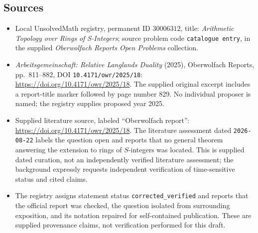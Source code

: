 \documentclass[11pt]{article}
\begin{document}
\subsection{Sources}
\begin{itemize}
\item Local UnsolvedMath registry, permanent ID \(30006312\), title: \emph{Arithmetic Topology over Rings of S-Integers}; source problem code \texttt{catalogue entry}, in the supplied \emph{Oberwolfach Reports Open Problems} collection.
\item \emph{Arbeitsgemeinschaft: Relative Langlands Duality} (2025), Oberwolfach Reports, pp.~811--882, DOI \texttt{10.4171/owr/2025/18}: \url{https://doi.org/10.4171/owr/2025/18}. The supplied original excerpt includes a report-title marker followed by page number 829. No individual proposer is named; the registry supplies proposed year 2025.
\item Supplied literature source, labeled ``Oberwolfach report'': \url{https://doi.org/10.4171/owr/2025/18}. The literature assessment dated \texttt{2026-08-22} labels the question open and reports that no general theorem answering the extension to rings of \(S\)-integers was located. This is supplied dated curation, not an independently verified literature assessment; the background expressly requests independent verification of time-sensitive status and cited claims.
\item The registry assigns statement status \texttt{corrected\_verified} and reports that the official report was checked, the question isolated from surrounding exposition, and its notation repaired for self-contained publication. These are supplied provenance claims, not verification performed for this draft.
\end{itemize}
\end{document}
